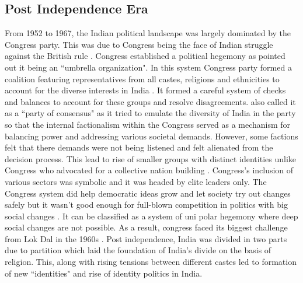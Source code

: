\subsection{Post Independence Era}
 From 1952 to 1967, the Indian political landscape was largely dominated by the Congress party. This was due to Congress being the face of Indian struggle against the British rule \citep{shastri1991nehru}. Congress established a political hegemony as \cite{kothari1967india} pointed out it being an ``umbrella organization". In this system Congress party formed a  coalition featuring representatives from all castes, religions and ethnicities to account for the diverse interests in India \citep{anand2015downfall}. It formed a careful system of checks and balances to account for these groups and resolve disagreements. \cite{kothari1967india} also called it as a ``party of consensus" as it tried to emulate the diversity of India in the party so that the internal factionalism within the Congress served as a mechanism for balancing power and addressing various societal demands. However, some factions felt that there demands were not being listened and felt alienated from the decision process. This lead to rise of smaller groups with distinct identities unlike Congress who advocated for a collective nation building \citep{shastri2003continuity}.  Congress’s inclusion of various sectors was symbolic and it
was headed by elite leaders only. The Congress system did help democratic ideas grow and let society try out changes safely but it wasn’t good enough for full-blown competition
in politics with big social changes \citep{shastri2009electoral}. It
can be classified as a system of uni polar hegemony where deep social changes are not possible. As a result, congress faced its biggest challenge from Lok Dal in the 1960s \citep{desouza2006india}. Post independence, India was divided in two parts due to partition which laid the foundation of India's divide on the basis of religion. This, along with rising tensions between different castes led to formation of new ``identities" and rise of identity politics in India. 

